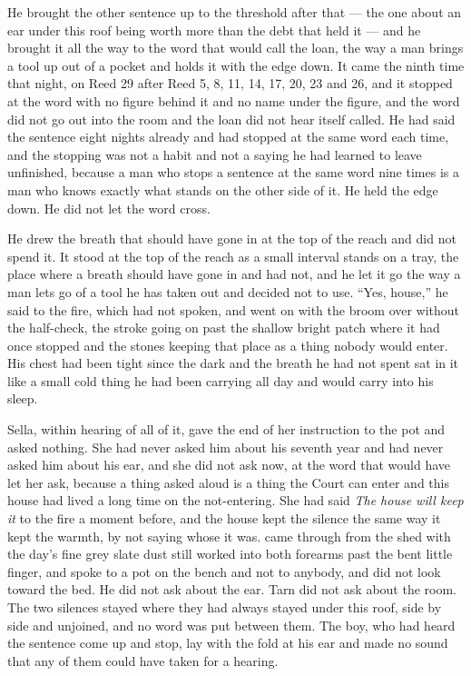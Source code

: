 He brought the other sentence up to the threshold after that --- the one about an ear under this roof being worth more than the debt that held it --- and he brought it all the way to the word that would call the loan, the way a man brings a tool up out of a pocket and holds it with the edge down. It came the ninth time that night, on Reed 29 after Reed 5, 8, 11, 14, 17, 20, 23 and 26, and it stopped at the word with no figure behind it and no name under the figure, and the word did not go out into the room and the loan did not hear itself called. He had said the sentence eight nights already and had stopped at the same word each time, and the stopping was not a habit and not a saying he had learned to leave unfinished, because a man who stops a sentence at the same word nine times is a man who knows exactly what stands on the other side of it. He held the edge down. He did not let the word cross.

He drew the breath that should have gone in at the top of the reach and did not spend it. It stood at the top of the reach as a small interval stands on a tray, the place where a breath should have gone in and had not, and he let it go the way a man lets go of a tool he has taken out and decided not to use. “Yes, house,” he said to the fire, which had not spoken, and went on with the broom over  without the half-check, the stroke going on past the shallow bright patch where it had once stopped and the stones keeping that place as a thing nobody would enter. His chest had been tight since the dark and the breath he had not spent sat in it like a small cold thing he had been carrying all day and would carry into his sleep.

Sella, within hearing of all of it, gave the end of her instruction to the pot and asked nothing. She had never asked him about his seventh year and had never asked him about his ear, and she did not ask now, at the word that would have let her ask, because a thing asked aloud is a thing the Court can enter and this house had lived a long time on the not-entering. She had said \emph{The house will keep it} to the fire a moment before, and the house kept the silence the same way it kept the warmth, by not saying whose it was.  came through from the shed with the day's fine grey slate dust still worked into both forearms past the bent little finger, and spoke to a pot on the bench and not to anybody, and did not look toward the bed. He did not ask about the ear. Tarn did not ask about the room. The two silences stayed where they had always stayed under this roof, side by side and unjoined, and no word was put between them. The boy, who had heard the sentence come up and stop, lay with the fold at his ear and made no sound that any of them could have taken for a hearing.

